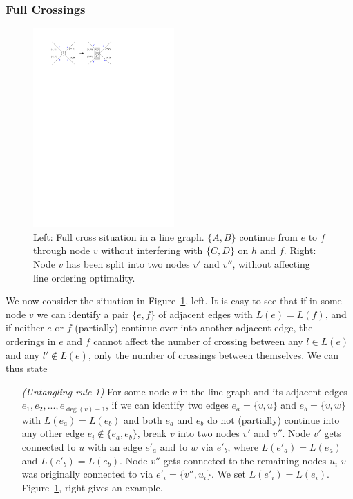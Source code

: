 \documentclass[sigconf]{acmart}
\begin{document}
\subsubsection{Full Crossings}

\begin{figure}
  \centering
  \includegraphics[width=0.48\textwidth]{untangling/fullcross.pdf}
  \caption{Left: Full cross situation in a line graph. $\{A, B\}$ continue from $e$ to $f$ through node $v$ without interfering with $\{C, D\}$ on $h$ and $f$. Right: Node $v$ has been split into two nodes $v'$ and $v''$, without affecting line ordering optimality.}  
  \label{FIG:untangle_fullcross}
\end{figure}

We now consider the situation in Figure~\ref{FIG:untangle_fullcross}, left. It is easy to see that if in some node $v$ we can identify a pair $\{e, f\}$ of adjacent edges with $L(e) = L(f)$, and if neither $e$ or $f$ (partially) continue over into another adjacent edge, the orderings in $e$ and $f$ cannot affect the number of crossing between any $l \in L(e)$ and any $l' \not\in L(e)$, only the number of crossings between themselves. We can thus state 
\begin{enumerate}[parsep=0.5mm, wide, labelwidth=0mm, itemindent=2.3mm]
  \setlength\itemsep{1pt}
  \item[\emph{(Untangling rule 1)}] For some node $v$ in the line graph and its adjacent edges $e_1, e_2, ..., e_{\deg(v)-1}$, if we can identify two edges $e_a = \{v, u\}$ and $e_b = \{v, w\}$ with $L(e_a) = L(e_b)$ and both $e_a$ and $e_b$ do not (partially) continue into any other edge $e_i \not\in \{e_a, e_b\}$, break $v$ into two nodes $v'$ and $v''$. Node $v'$ gets connected to $u$ with an edge $e'_a$ and to $w$ via $e'_b$, where $L(e'_a) = L(e_a)$ and $L(e'_b) = L(e_b)$. Node $v''$ gets connected to the remaining nodes $u_i$ $v$ was originally connected to via $e'_i = \{v'', u_i\}$. We set $L(e'_i) = L(e_i)$. Figure~\ref{FIG:untangle_fullcross}, right gives an example.
\end{enumerate}
\end{document}
